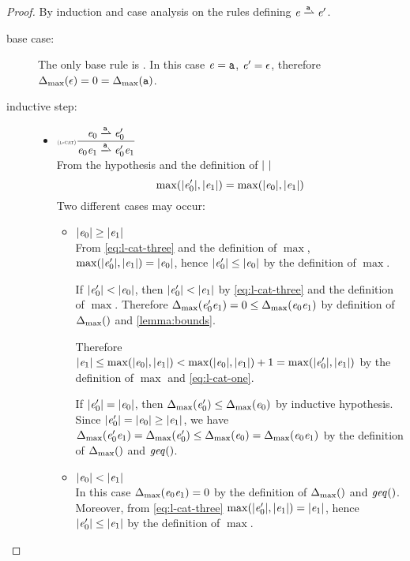 \begin{proof}
 By induction and case analysis on the rules defining $\re\parDer{\sym}\re'$.
 \begin{description}
  \item[base case:] The only base rule is .
   In this case $\mathit {e}=\mathtt {a}$, $\mathit {e}'=\mathtt {\epsilon}$, therefore ${\Delta_{\max}}({\mathtt {\epsilon}})=0={\Delta_{\max}}({\mathtt {a}})$.
  \item[inductive step:] \hspace*{\fill}
   \begin{itemize}
    \item $\Rule{l-cat}{\re_0\parDer{\sym}\re'_0}{\re_0\catop\re_1\parDer{\sym}\re'_0\catop\re_1}{}$\\[2ex]
          From the hypothesis and the definition of ${\mid}{\ }{\mid}$
          \begin{equation}
           \label{eq:l-cat-three}
           \max({\mid}{\mathit {e}_0'}{\mid},{\mid}{\mathit {e}_1}{\mid})=\max({\mid}{\mathit {e}_0}{\mid},{\mid}{\mathit {e}_1}{\mid})
          \end{equation}
          Two different cases may occur:
          \begin{itemize}
           \item ${\mid}{\mathit {e}_0}{\mid}\geq{\mid}{\ensuremath{\mathit {e}}_1}{\mid}$\\
                 From \cref{eq:l-cat-three} and the definition of $\max$, $\max({\mid}{\mathit {e}_0'}{\mid},{\mid}{\mathit {e}_1}{\mid})={\mid}{\mathit {e}_0}{\mid}$, hence ${\mid}{\mathit {e}_0'}{\mid}\leq{\mid}{\ensuremath{\mathit {e}}_0}{\mid}$ by the definition of $\max$.

                 If ${\mid}{\mathit {e}_0'}{\mid}<{\mid}{\mathit {e}_0}{\mid}$, then ${\mid}{\mathit {e}_0'}{\mid}<{\mid}{\mathit {e}_1}{\mid}$ by \cref{eq:l-cat-three} and the definition of $\max$. Therefore ${\Delta_{\max}}({\mathit {e}_0'\mathit {e}_1})=0\leq{\Delta_{\max}}({\mathit {e}_0\mathit {e}_1})$ by definition of ${\Delta_{\max}}({})$ and \cref{lemma:bounds}.

                 Therefore ${\mid}{\mathit {e}_1}{\mid}\leq\max({\mid}{\mathit {e}_0}{\mid},{\mid}{\mathit {e}_1}{\mid})<\max({\mid}{\mathit {e}_0}{\mid},{\mid}{\mathit {e}_1}{\mid})+1=\max({\mid}{\mathit {e}_0'}{\mid},{\mid}{\mathit {e}_1}{\mid})$ by the definition of $\max$ and \cref{eq:l-cat-one}.

                 If ${\mid}{\mathit {e}_0'}{\mid}={\mid}{\mathit {e}_0}{\mid}$, then ${\Delta_{\max}}({\mathit {e}_0'})\leq{\Delta_{\max}}({\mathit {e}_0})$ by inductive hypothesis. Since ${\mid}{\mathit {e}_0'}{\mid}={\mid}{\mathit {e}_0}{\mid}\geq{\mid}{\ensuremath{\mathit {e}}_1}{\mid}$, we have ${\Delta_{\max}}({\mathit {e}_0'\mathit {e}_1})={\Delta_{\max}}({\mathit {e}_0'})\leq{\Delta_{\max}}({\mathit {e}_0})={\Delta_{\max}}({\mathit {e}_0\mathit {e}_1})$ by the definition of ${\Delta_{\max}}({})$ and $\mathit{geq}()$.
           \item ${\mid}{\mathit {e}_0}{\mid}<{\mid}{\mathit {e}_1}{\mid}$\\
                 In this case ${\Delta_{\max}}({\mathit {e}_0\mathit {e}_1})=0$ by the definition of ${\Delta_{\max}}({})$ and $\mathit{geq}()$. Moreover, from \cref{eq:l-cat-three} $\max({\mid}{\mathit {e}_0'}{\mid},{\mid}{\mathit {e}_1}{\mid})={\mid}{\mathit {e}_1}{\mid}$, hence ${\mid}{\mathit {e}_0'}{\mid}\leq{\mid}{\ensuremath{\mathit {e}}_1}{\mid}$ by the definition of $\max$.


\end{itemize}
\end{itemize}
\end{description}
\end{proof}
